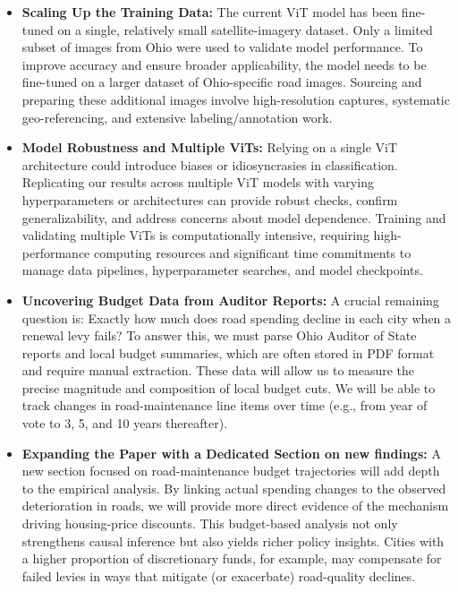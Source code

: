 \begin{itemize}
    \item {\bf Scaling Up the Training Data:} The current ViT model has been fine-tuned on a single, relatively small satellite-imagery dataset. Only a limited subset of images from Ohio were used to validate model performance.
    To improve accuracy and ensure broader applicability, the model needs to be fine-tuned on a larger dataset of Ohio-specific road images. Sourcing and preparing these additional images involve high-resolution captures, systematic geo-referencing, and extensive labeling/annotation work.

    \item {\bf Model Robustness and Multiple ViTs:} Relying on a single ViT architecture could introduce biases or idiosyncrasies in classification. Replicating our results across multiple ViT models with varying hyperparameters or architectures can provide robust checks, confirm generalizability, and address concerns about model dependence.
    Training and validating multiple ViTs is computationally intensive, requiring high-performance computing resources and significant time commitments to manage data pipelines, hyperparameter searches, and model checkpoints.
    
    \item {\bf Uncovering Budget Data from Auditor Reports:} A crucial remaining question is: Exactly how much does road spending decline in each city when a renewal levy fails? To answer this, we must parse Ohio Auditor of State reports and local budget summaries, which are often stored in PDF format and require manual extraction. These data will allow us to measure the precise magnitude and composition of local budget cuts. We will be able to track changes in road-maintenance line items over time (e.g., from year of vote to 3, 5, and 10 years thereafter).
    
    \item {\bf Expanding the Paper with a Dedicated Section on new findings:} A new section focused on road-maintenance budget trajectories will add depth to the empirical analysis. By linking actual spending changes to the observed deterioration in roads, we will provide more direct evidence of the mechanism driving housing-price discounts. This budget-based analysis not only strengthens causal inference but also yields richer policy insights. Cities with a higher proportion of discretionary funds, for example, may compensate for failed levies in ways that mitigate (or exacerbate) road-quality declines.
\end{itemize}

